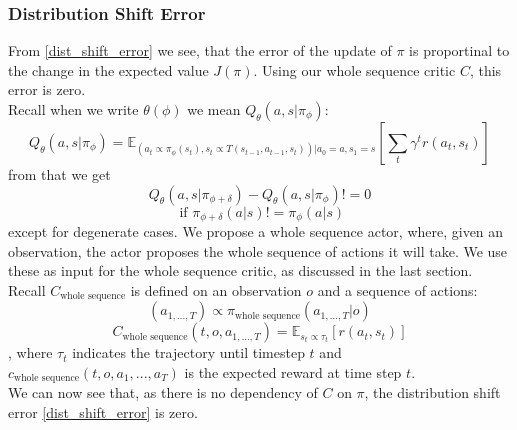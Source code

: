 \subsubsection{Distribution Shift Error}
\label{dist_shift_error_section}
From \ref{dist_shift_error} we see, that the error of the update of $\pi$ is proportinal to the change in the 
expected value $J(\pi)$. Using our whole sequence critic $C$, this error is zero. \\ 


Recall when we write $\theta(\phi)$ we mean $Q_{\theta}(a,s|\pi_{\phi})$:
\begin{equation*}
    Q_{\theta}(a,s|\pi_{\phi}) = \mathbb{E}_{(a_t \propto \pi_{\phi}(s_t), s_t \propto T(s_{t-1}, a_{t-1}, s_t))|a_0=a, s_1=s}\left[\sum_t \gamma^t r(a_t, s_t)\right]
\end{equation*}
from that we get
\begin{equation}
    Q_{\theta }(a,s|\pi_{\phi + \delta}) - Q_{\theta}(a,s|\pi_{\phi}) != 0 
\end{equation}
\begin{equation*}
    \text{ if } \pi_{\phi + \delta}(a|s) != \pi_{\phi}(a|s)
\end{equation*}
except for degenerate cases. We propose a whole sequence actor, where, given an observation, the actor proposes the whole sequence of actions it will 
take. We use these as input for the whole sequence critic, as discussed in the last section. 
Recall $C_{\text{whole sequence}}$ is defined on an observation $o$ and a 
sequence of actions: 
\begin{equation}
    (a_{1,...,T}) \propto \pi_{\text{whole sequence}}(a_{1,...,T}|o)
\end{equation}
\begin{equation*}
    C_{\text{whole sequence}}(t, o, a_{1,...,T}) = \mathbb{E}_{s_t \propto \tau_t}\left[r(a_t, s_t)\right]
\end{equation*}
, where $\tau_t$ indicates the trajectory until timestep $t$ and $c_{\text{whole sequence}}(t, o, a_1, ..., a_T)$ is the expected reward at time step $t$. \\
We can now see that, as there is no dependency of $C$ on $\pi$, the distribution shift error \ref{dist_shift_error} is zero. 

